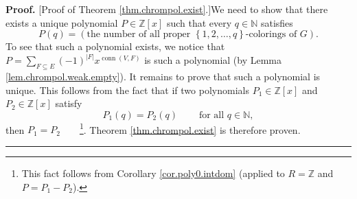 \documentclass[numbers=enddot,12pt,final,onecolumn,notitlepage]{scrartcl}%
\theoremstyle{definition}
\newenvironment{proof}[1][Proof]{\noindent\textbf{#1.} }{\ \rule{0.5em}{0.5em}}
\newenvironment{vershort}{}{}
\let\sumnonlimits\sum
\renewcommand{\sum}{\sumnonlimits\limits}
\begin{document}
\begin{vershort}
\begin{proof}
[Proof of Theorem \ref{thm.chrompol.exist}.]We need to show that there exists
a unique polynomial $P\in\mathbb{Z}\left[  x\right]  $ such that every
$q\in\mathbb{N}$ satisfies%
\[
P\left(  q\right)  =\left(  \text{the number of all proper }\left\{
1,2,\ldots,q\right\}  \text{-colorings of }G\right)  .
\]
To see that such a polynomial exists, we notice that $P=\sum_{F\subseteq
E}\left(  -1\right)  ^{\left\vert F\right\vert }x^{\operatorname*{conn}\left(
V,F\right)  }$ is such a polynomial (by Lemma \ref{lem.chrompol.weak.empty}).
It remains to prove that such a polynomial is unique. This follows from the
fact that if two polynomials $P_{1}\in\mathbb{Z}\left[  x\right]  $ and
$P_{2}\in\mathbb{Z}\left[  x\right]  $ satisfy
\[
P_{1}\left(  q\right)  =P_{2}\left(  q\right)  \ \ \ \ \ \ \ \ \ \ \text{for
all }q\in\mathbb{N},
\]
then $P_{1}=P_{2}$\ \ \ \ \footnote{This fact follows from Corollary
\ref{cor.poly0.intdom} (applied to $R=\mathbb{Z}$ and $P=P_{1}-P_{2}$).}.
Theorem \ref{thm.chrompol.exist} is therefore proven.
\end{proof}
\end{vershort}
\end{document}
